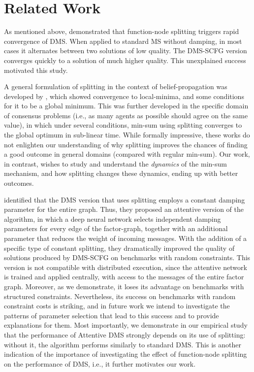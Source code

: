\section{Related Work}
\label{Sec:related}
As mentioned above, \citet{CohenGZ20} demonstrated that function-node splitting triggers rapid convergence of DMS. When applied to standard MS without damping, in most cases it alternates between two solutions of low quality. The DMS-SCFG version converges quickly to a solution of much higher quality. This unexplained success motivated this study.

A general formulation of splitting in the context of belief-propagation was developed by \citet{ruozzi2013}, which showed convergence to local-minima, and some conditions for it to be a global minimum. This was further developed \cite{rebeschini2017} in the specific domain of consensus problems (i.e., as many agents as possible should agree on the same value), in which under several conditions, min-sum using splitting converges to the global optimum in sub-linear time. While formally impressive, these works do not enlighten our understanding of why splitting improves the chances of finding a good outcome in general domains (compared with regular min-sum). Our work, in contrast, wishes to study and understand the \emph{dynamics} of the min-sum mechanism, and how splitting changes these dynamics, ending up with better outcomes.

\citet{DengKL022} identified that the DMS version that uses splitting employs a constant damping parameter for the entire graph. Thus, they proposed an attentive version of the algorithm, in which a deep neural network selects independent damping parameters for every edge of the factor-graph, together with an additional parameter that reduces the weight of incoming messages. With the addition of a specific type of constant splitting, they dramatically improved the quality of solutions produced by DMS-SCFG on benchmarks with random constraints.
This version is not compatible with distributed execution, since the attentive network is trained and applied centrally, with access to the messages of the entire factor graph.%
Moreover, as we demonstrate, it loses its advantage on benchmarks with structured constraints. Nevertheless, its success on benchmarks with random constraint costs is striking, and in future work we intend to investigate the patterns of parameter selection that lead to this success and to provide explanations for them.
Most importantly, we demonstrate in our empirical study that the performance of Attentive DMS strongly depends on its use of splitting: without it, the algorithm performs similarly to standard DMS. This is another indication of the importance of investigating the effect of function-node splitting on the performance of DMS, i.e., it further motivates our work.


